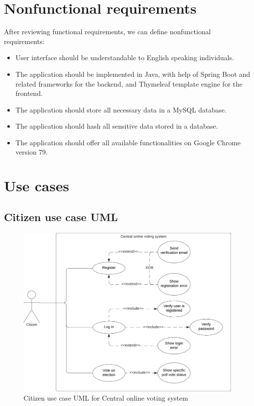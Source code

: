 \documentclass[a4paper,twoside,12pt]{book}
\newcommand{\Title}{Central online voting system}
\begin{document}
  \section{Nonfunctional requirements}
    After reviewing functional requirements, we can define nonfunctional requirements:
    \begin{itemize}
      \item User interface should be understandable to English speaking individuals.
      \item The application should be implemented in Java, with help of Spring Boot and related frameworks for the backend, 
      and Thymeleaf template engine for the frontend.
      \item The application should store all necessary data in a MySQL database.
      \item The application should hash all sensitive data stored in a database. %
      \item The application should offer all available functionalities on Google Chrome version 79.
    \end{itemize}
  \pagebreak

  \section{Use cases}
    \subsection{Citizen use case UML}
    \begin{figure}[h]
      \includegraphics[width=\linewidth]{citizen_uml.png}
      \caption{Citizen use case UML for \Title}
      \label{fig:citizen_uml}
    \end{figure}
\end{document}
